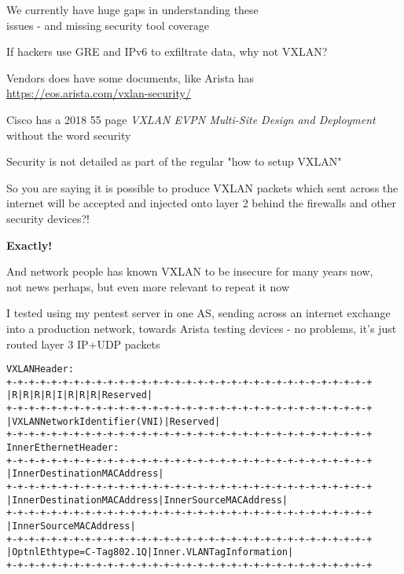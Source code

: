 \documentclass[Screen16to9,17pt]{foils}
\begin{document}
\vskip 1cm
{\Large We currently have huge gaps in understanding these\\
issues - and missing security tool coverage}

\vskip 5mm

{\small If hackers use GRE and IPv6 to exfiltrate data, why not VXLAN?}


\begin{list2}
\item Vendors does have some documents, like Arista has\\ \url{https://eos.arista.com/vxlan-security/}
\item Cisco has a 2018 55 page \emph{VXLAN EVPN Multi-Site
Design and Deployment} \\
without the word security \smiley
\item Security is not detailed as part of the regular "how to setup VXLAN"
\end{list2}



\vskip 2cm
So you are saying it is possible to produce VXLAN packets which sent across the internet will be accepted and injected onto layer 2 behind the firewalls and other security devices?!

\vskip 1cm
{\bf\LARGE Exactly!}

\vskip 2cm
And network people has known VXLAN to be insecure for many years now,\\
not news perhaps, but even more relevant to repeat it now


I tested using my pentest server in one AS, sending across an internet exchange into a production network, towards Arista testing devices - no problems, it's just routed layer 3 IP+UDP packets


\begin{alltt}\footnotesize
VXLAN Header:
+-+-+-+-+-+-+-+-+-+-+-+-+-+-+-+-+-+-+-+-+-+-+-+-+-+-+-+-+-+-+-+-+
|R|R|R|R|I|R|R|R|            Reserved                           |
+-+-+-+-+-+-+-+-+-+-+-+-+-+-+-+-+-+-+-+-+-+-+-+-+-+-+-+-+-+-+-+-+
|                VXLAN Network Identifier (VNI) |   Reserved    |
+-+-+-+-+-+-+-+-+-+-+-+-+-+-+-+-+-+-+-+-+-+-+-+-+-+-+-+-+-+-+-+-+
Inner Ethernet Header:
+-+-+-+-+-+-+-+-+-+-+-+-+-+-+-+-+-+-+-+-+-+-+-+-+-+-+-+-+-+-+-+-+
|             Inner Destination MAC Address                     |
+-+-+-+-+-+-+-+-+-+-+-+-+-+-+-+-+-+-+-+-+-+-+-+-+-+-+-+-+-+-+-+-+
| Inner Destination MAC Address | Inner Source MAC Address      |
+-+-+-+-+-+-+-+-+-+-+-+-+-+-+-+-+-+-+-+-+-+-+-+-+-+-+-+-+-+-+-+-+
|                Inner Source MAC Address                       |
+-+-+-+-+-+-+-+-+-+-+-+-+-+-+-+-+-+-+-+-+-+-+-+-+-+-+-+-+-+-+-+-+
|OptnlEthtype = C-Tag 802.1Q    | Inner.VLAN Tag Information    |
+-+-+-+-+-+-+-+-+-+-+-+-+-+-+-+-+-+-+-+-+-+-+-+-+-+-+-+-+-+-+-+-+
\end{alltt}
\end{document}
